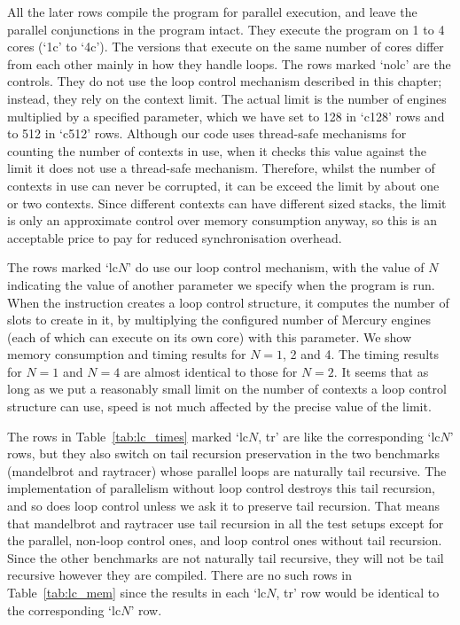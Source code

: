 All the later rows
compile the program for parallel execution,
and leave the parallel conjunctions in the program intact.
They execute the program on 1 to 4 cores (`1c' to `4c').
The versions that execute on the same number of cores
differ from each other mainly in how they handle loops.
The rows marked `nolc' are the controls.
They do not use the loop control mechanism described in this chapter;
instead, they rely on the context limit.
The actual limit is the number of engines
multiplied by a specified parameter,
which we have set to 128 in `c128' rows and to 512 in `c512' rows.
Although our code uses thread-safe mechanisms for counting the number of
contexts in use,
when it checks this value against the limit it does not use a thread-safe
mechanism.
Therefore, whilst the number of contexts in use can never be corrupted,
it can be exceed the limit by about one or two contexts.
Since different contexts can have different sized stacks,
the limit is only an approximate control over memory consumption anyway,
so this is an acceptable price to pay for reduced synchronisation overhead.

The rows marked `lc$N$' do use our loop control mechanism,
with the value of $N$ indicating
the value of another parameter we specify when the program is run.
When the  instruction
creates a loop control structure,
it computes the number of slots to create in it,
by multiplying the configured number of Mercury engines
(each of which can execute on its own core)
with this parameter.
We show memory consumption and timing results for $N=1$, 2 and 4.
The timing results for $N=1$ and $N=4$ are almost identical to those for
$N=2$.
It seems that as long as we put a reasonably small limit
on the number of contexts a loop control structure can use,
speed is not much affected by the precise value of the limit.

The rows in Table~\ref{tab:lc_times}
marked `lc$N$, tr' are like the corresponding `lc$N$' rows,
but they also switch on tail recursion preservation
in the two benchmarks (mandelbrot and raytracer)
whose parallel loops are naturally tail recursive.
The implementation of parallelism without loop control
destroys this tail recursion,
and so does loop control unless we ask it to preserve tail recursion.
That means that mandelbrot and raytracer use tail recursion
in all the test setups except for
the parallel, non-loop control ones,
and loop control ones without tail recursion.
Since the other benchmarks are not naturally tail recursive,
they will not be tail recursive however they are compiled.
There are no such rows in Table~\ref{tab:lc_mem}
since the results in each `lc$N$, tr' row
would be identical to the corresponding `lc$N$' row.

